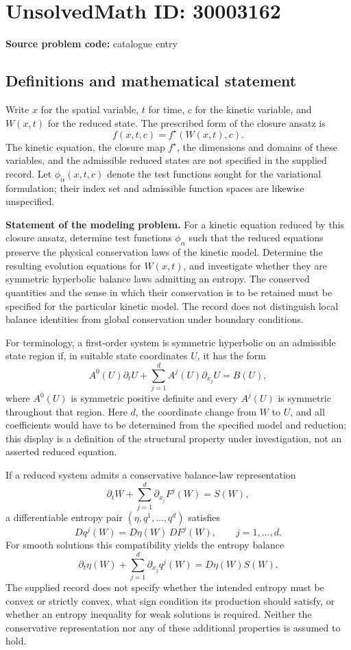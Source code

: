 \documentclass[11pt]{article}
\begin{document}
\section*{UnsolvedMath ID: 30003162}
\textbf{Source problem code:} catalogue entry
\subsection{Definitions and mathematical statement}
Write \(x\) for the spatial variable, \(t\) for time, \(c\) for the kinetic variable, and \(W(x,t)\) for the reduced state. The prescribed form of the closure ansatz is
\[
 f(x,t,c)=f^{\star}(W(x,t),c).
\]
The kinetic equation, the closure map \(f^{\star}\), the dimensions and domains of these variables, and the admissible reduced states are not specified in the supplied record. Let \(\phi_{\alpha}(x,t,c)\) denote the test functions sought for the variational formulation; their index set and admissible function spaces are likewise unspecified.

\textbf{Statement of the modeling problem.} For a kinetic equation reduced by this closure ansatz, determine test functions \(\phi_{\alpha}\) such that the reduced equations preserve the physical conservation laws of the kinetic model. Determine the resulting evolution equations for \(W(x,t)\), and investigate whether they are symmetric hyperbolic balance laws admitting an entropy. The conserved quantities and the sense in which their conservation is to be retained must be specified for the particular kinetic model. The record does not distinguish local balance identities from global conservation under boundary conditions.

For terminology, a first-order system is symmetric hyperbolic on an admissible state region if, in suitable state coordinates \(U\), it has the form
\[
 A^0(U)\partial_t U+\sum_{j=1}^{d}A^j(U)\partial_{x_j}U=B(U),
\]
where \(A^0(U)\) is symmetric positive definite and every \(A^j(U)\) is symmetric throughout that region. Here \(d\), the coordinate change from \(W\) to \(U\), and all coefficients would have to be determined from the specified model and reduction; this display is a definition of the structural property under investigation, not an asserted reduced equation.

If a reduced system admits a conservative balance-law representation
\[
 \partial_t W+\sum_{j=1}^{d}\partial_{x_j}F^j(W)=S(W),
\]
a differentiable entropy pair \((\eta,q^1,\ldots,q^d)\) satisfies
\[
 Dq^j(W)=D\eta(W)\,DF^j(W),\qquad j=1,\ldots,d.
\]
For smooth solutions this compatibility yields the entropy balance
\[
 \partial_t\eta(W)+\sum_{j=1}^{d}\partial_{x_j}q^j(W)
 =D\eta(W)S(W).
\]
The supplied record does not specify whether the intended entropy must be convex or strictly convex, what sign condition its production should satisfy, or whether an entropy inequality for weak solutions is required. Neither the conservative representation nor any of these additional properties is assumed to hold.
\end{document}
